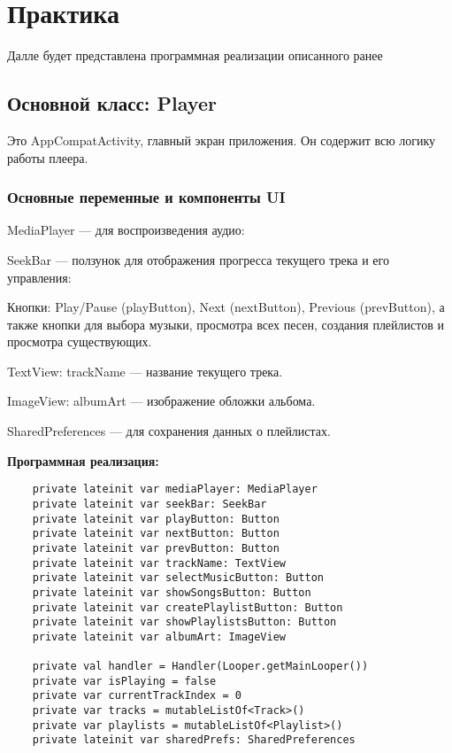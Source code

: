 \chapter{Практика}
\label{ch:chap2}

Далле будет представлена программная реализации описанного ранее

\section{Основной класс: Player}

Это AppCompatActivity, главный экран приложения. Он содержит всю логику работы плеера.

	
\subsection{Основные переменные и компоненты UI}

MediaPlayer — для воспроизведения аудио:

SeekBar — ползунок для отображения прогресса текущего трека и его управления:

Кнопки: Play/Pause (playButton), Next (nextButton), Previous (prevButton), а также кнопки для выбора музыки, просмотра всех песен, создания плейлистов и просмотра существующих.

TextView: trackName — название текущего трека.

ImageView: albumArt — изображение обложки альбома.

SharedPreferences — для сохранения данных о плейлистах.


\textbf{Программная реализация:}
\begin{verbatim}
	private lateinit var mediaPlayer: MediaPlayer
    private lateinit var seekBar: SeekBar
    private lateinit var playButton: Button
    private lateinit var nextButton: Button
    private lateinit var prevButton: Button
    private lateinit var trackName: TextView
    private lateinit var selectMusicButton: Button
    private lateinit var showSongsButton: Button
    private lateinit var createPlaylistButton: Button
    private lateinit var showPlaylistsButton: Button
    private lateinit var albumArt: ImageView

    private val handler = Handler(Looper.getMainLooper())
    private var isPlaying = false
    private var currentTrackIndex = 0
    private var tracks = mutableListOf<Track>()
    private var playlists = mutableListOf<Playlist>()
    private lateinit var sharedPrefs: SharedPreferences
\end{verbatim}

